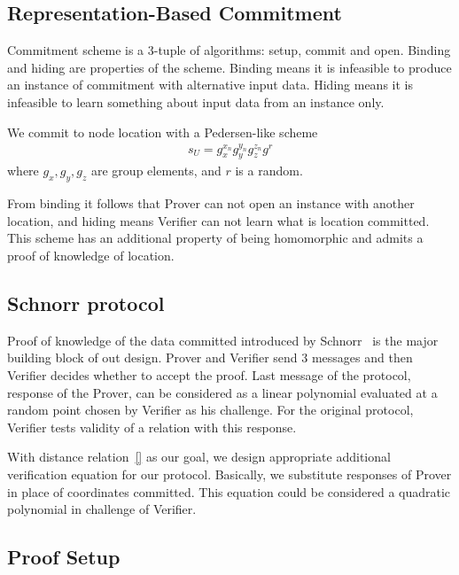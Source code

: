 \documentclass{article}
\begin{document}
\subsection{Representation-Based Commitment}

Commitment scheme is a 3-tuple of algorithms: setup, commit and open.
Binding and hiding are properties of the scheme.
Binding means it is infeasible to produce an instance of commitment with alternative input data.
Hiding means it is infeasible to learn something about input data from an instance only.

We commit to node location with a Pedersen-like scheme~\cite{PedersenCommit,BrandsPKIbook}
\begin{gather}
\label{cmt-up-cp}
  s_U = g_x^{x_n} g_y^{y_n} g_z^{z_n} g^{r}
\end{gather}
where $g_x, g_y, g_z$ are group elements, and $r$ is a random.

From binding it follows that Prover can not open an instance with another location,
and hiding means Verifier can not learn what is location committed.
This scheme has an additional property of being homomorphic
and admits a proof of knowledge of location.


\subsection{Schnorr protocol}

Proof of knowledge of the data committed introduced by Schnorr~\cite{}
is the major building block of out design.
Prover and Verifier send 3 messages and then Verifier decides whether to accept the proof.
Last message of the protocol, response of the Prover, can be considered as
a linear polynomial evaluated at a random point chosen by Verifier as his challenge.
For the original protocol, Verifier tests validity of a relation with this response.

With distance relation~\eqref{} as our goal, we design appropriate additional verification equation
for our protocol.
Basically, we substitute responses of Prover in place of coordinates committed.
This equation could be considered a quadratic polynomial in challenge of Verifier.

\subsection{Proof Setup}
\end{document}
